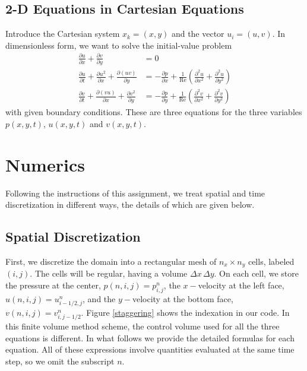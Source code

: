 \documentclass[11pt]{article}
\newcommand{\Rey}{\text{Re}}
\newcommand{\ind}[4]{{#1}^{#2}_{#3,#4}}
\begin{document}
\subsection{2-D Equations in Cartesian Equations}

Introduce the Cartesian system $x_k = (x, y)$ and the vector $u_i = (u, v)$. In dimensionless form, we want to solve the initial-value problem 
\begin{align}
\frac{\partial u}{\partial x} + \frac{\partial v}{\partial y} &= 0\\
\frac{\partial u}{\partial t} + \frac{\partial u^2}{\partial x} + \frac{\partial (uv)}{\partial y} &= -\frac{\partial p}{\partial x} + \frac{1}{\Rey}\left( \frac{\partial^2 u}{\partial x^2} + \frac{\partial^2 u}{\partial y^2} \right)\\
\frac{\partial v}{\partial t} + \frac{\partial (vu)}{\partial x} + \frac{\partial v^2}{\partial y} &= -\frac{\partial p}{\partial y} + \frac{1}{\Rey}\left( \frac{\partial^2 v}{\partial x^2} + \frac{\partial^2 v}{\partial y^2} \right)
\end{align}
with given boundary conditions. These are three equations for the three variables $p(x,y,t)$, $u(x,y,t)$ and $v(x,y,t)$.

\section{Numerics}

Following the instructions of this assignment, we treat spatial and time discretization in different ways, the details of which are given below.

\subsection{Spatial Discretization}

First, we discretize the domain into a rectangular mesh of $n_x\times n_y$ cells, labeled $(i,j)$. The cells will be regular, having a volume $\Delta x\,\Delta y$. On each cell, we store the pressure at the center, $p(n,i,j) = \ind{p}{n}{i}{j}$, the $x-$velocity at the left face, $u(n,i,j) = \ind{u}{n}{i-1/2}{j}$, and the $y-$velocity at the bottom face, $v(n,i,j) = \ind{v}{n}{i}{j-1/2}$. Figure \ref{staggering} shows the indexation in our code. In this finite volume method scheme, the control volume used for all the three equations is different. In what follows we provide the detailed formulas for each equation. All of these expressions involve quantities evaluated at the same time step, so we omit the subscript $n$. 
\end{document}
